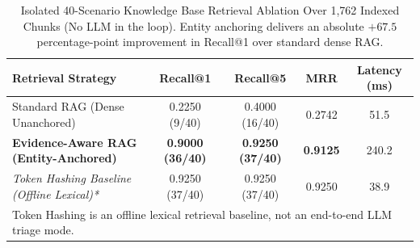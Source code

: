 \begin{table}[t]
\centering
\small
\caption{Isolated 40-Scenario Knowledge Base Retrieval Ablation Over 1,762 Indexed Chunks (No LLM in the loop). Entity anchoring delivers an absolute $+67.5$ percentage-point improvement in Recall@1 over standard dense RAG.}
\label{tab:retrieval_ablation}
\begin{tabular}{lcccc}
\toprule
\textbf{Retrieval Strategy} & \textbf{Recall@1} & \textbf{Recall@5} & \textbf{MRR} & \textbf{Latency (ms)} \\
\midrule
Standard RAG (Dense Unanchored) & 0.2250 (9/40) & 0.4000 (16/40) & 0.2742 & 51.5 \\
\textbf{Evidence-Aware RAG (Entity-Anchored)} & \textbf{0.9000 (36/40)} & \textbf{0.9250 (37/40)} & \textbf{0.9125} & 240.2 \\
\midrule
\textit{Token Hashing Baseline (Offline Lexical)*} & 0.9250 (37/40) & 0.9250 (37/40) & 0.9250 & 38.9 \\
\bottomrule
\multicolumn{5}{l}{\footnotesize *Token Hashing is an offline lexical retrieval baseline, not an end-to-end LLM triage mode.} \\
\end{tabular}
\end{table}
